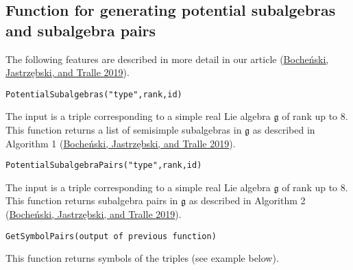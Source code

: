 \documentclass[
]{article}
\begin{document}
\hypertarget{function-for-generating-potential-subalgebras-and-subalgebra-pairs}{%
\subsection{Function for generating potential subalgebras and subalgebra
pairs}\label{function-for-generating-potential-subalgebras-and-subalgebra-pairs}}

The following features are described in more detail in our article
(\protect\hyperlink{ref-BJT}{Bocheński, Jastrzębski, and Tralle 2019}).

\begin{verbatim}
PotentialSubalgebras("type",rank,id)
\end{verbatim}

The input is a triple corresponding to a simple real Lie algebra
\(\mathfrak{g}\) of rank up to 8. This function returns a list of
semisimple subalgebras in \(\mathfrak{g}\) as described in Algorithm 1
(\protect\hyperlink{ref-BJT}{Bocheński, Jastrzębski, and Tralle 2019}).

\begin{verbatim}
PotentialSubalgebraPairs("type",rank,id)
\end{verbatim}

The input is a triple corresponding to a simple real Lie algebra
\(\mathfrak{g}\) of rank up to 8. This function returns subalgebra pairs
in \(\mathfrak{g}\) as described in Algorithm 2
(\protect\hyperlink{ref-BJT}{Bocheński, Jastrzębski, and Tralle 2019}).

\begin{verbatim}
GetSymbolPairs(output of previous function)
\end{verbatim}

This function returns symbols of the triples (see example below).
\end{document}
